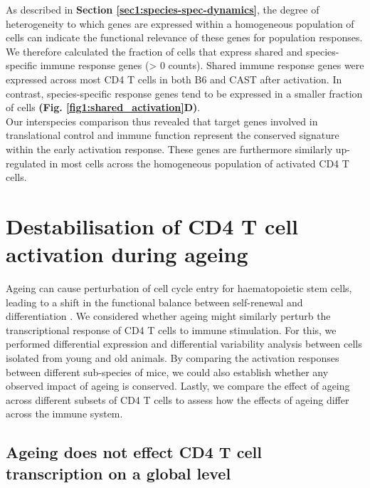 As described in \textbf{Section \ref{sec1:species-spec-dynamics}}, the degree of heterogeneity to which genes are expressed within a homogeneous population of cells can indicate the functional relevance of these genes for population responses. We therefore calculated the fraction of cells that express shared and species-specific immune response genes (> 0 counts). Shared immune response genes were expressed across most CD4\plus{} T cells in both B6 and CAST after activation. In contrast, species-specific response genes tend to be expressed in a smaller fraction of cells \textbf{(Fig. \ref{fig1:shared_activation}D)}. \\

Our interspecies comparison thus revealed that target genes involved in translational control and immune function represent the conserved signature within the early activation response. These genes are furthermore similarly up-regulated in most cells across the homogeneous population of activated CD4\plus{} T cells. 

\newpage

\section{Destabilisation of CD4\plus{} T cell activation during ageing}

Ageing can cause perturbation of cell cycle entry for haematopoietic stem cells, leading to a shift in the functional balance between self-renewal and differentiation \citep{Kowalczyk2015}. We considered whether ageing might similarly perturb the transcriptional response of CD4\plus{} T cells to immune stimulation. For this, we performed differential expression and differential variability analysis between cells isolated from young and old animals. By comparing the activation responses between different sub-species of mice, we could also establish whether any observed impact of ageing is conserved. Lastly, we compare the effect of ageing across different subsets of CD4\plus{} T cells to assess how the effects of ageing differ across the immune system.

\subsection{Ageing does not effect CD4\plus{} T cell transcription on a global level}
\label{sec1:global_changes}

